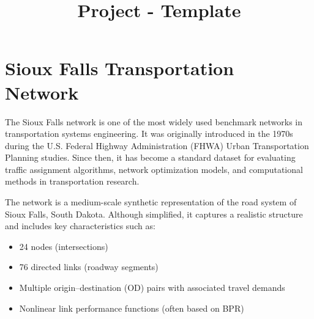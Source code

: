 \documentclass{rapportCS} %
\title{Project - Template}
\begin{document}







        
\fairemarges 
\fairepagedegarde 





\section{Sioux Falls Transportation Network}

The Sioux Falls network is one of the most widely used benchmark networks in transportation systems engineering. It was originally introduced in the 1970s during the U.S. Federal Highway Administration (FHWA) Urban Transportation Planning studies. Since then, it has become a standard dataset for evaluating traffic assignment algorithms, network optimization models, and computational methods in transportation research.

The network is a medium-scale synthetic representation of the road system of Sioux Falls, South Dakota. Although simplified, it captures a realistic structure and includes key characteristics such as:
\begin{itemize}
    \item 24 nodes (intersections)
    \item 76 directed links (roadway segments)
    \item Multiple origin--destination (OD) pairs with associated travel demands
    \item Nonlinear link performance functions (often based on BPR)
\end{itemize}
\end{document}

